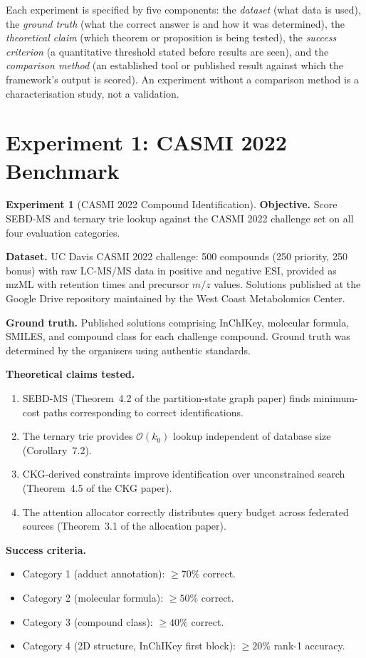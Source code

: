 \documentclass[11pt,a4paper]{article}
\theoremstyle{planstyle}
\theoremstyle{definition}
\newtheorem{experiment}[theorem]{Experiment}
\theoremstyle{remark}
\begin{document}
Each experiment is specified by five components: the \emph{dataset}
(what data is used), the \emph{ground truth} (what the correct answer
is and how it was determined), the \emph{theoretical claim} (which
theorem or proposition is being tested), the \emph{success criterion}
(a quantitative threshold stated before results are seen), and the
\emph{comparison method} (an established tool or published result
against which the framework's output is scored). An experiment without
a comparison method is a characterisation study, not a validation.

\section{Experiment 1: CASMI 2022 Benchmark}
\label{sec:exp-casmi}

\begin{experiment}[CASMI 2022 Compound Identification]
\label{exp:casmi}
\textbf{Objective.} Score SEBD-MS and ternary trie lookup against the
CASMI 2022 challenge set on all four evaluation categories.

\textbf{Dataset.} UC Davis CASMI 2022 challenge: 500 compounds (250
priority, 250 bonus) with raw LC-MS/MS data in positive and negative ESI,
provided as mzML with retention times and precursor $m/z$ values. Solutions
published at the Google Drive repository maintained by the West Coast
Metabolomics Center.

\textbf{Ground truth.} Published solutions comprising InChIKey, molecular
formula, SMILES, and compound class for each challenge compound. Ground
truth was determined by the organisers using authentic standards.

\textbf{Theoretical claims tested.}
\begin{enumerate}[nosep,label=(\roman*)]
\item SEBD-MS (Theorem~4.2 of the partition-state graph paper) finds
  minimum-cost paths corresponding to correct identifications.
\item The ternary trie provides $\mathcal{O}(k_0)$ lookup independent
  of database size (Corollary~7.2).
\item CKG-derived constraints improve identification over unconstrained
  search (Theorem~4.5 of the CKG paper).
\item The attention allocator correctly distributes query budget across
  federated sources (Theorem~3.1 of the allocation paper).
\end{enumerate}

\textbf{Success criteria.}
\begin{itemize}[nosep]
\item Category 1 (adduct annotation): $\geq 70\%$ correct.
\item Category 2 (molecular formula): $\geq 50\%$ correct.
\item Category 3 (compound class): $\geq 40\%$ correct.
\item Category 4 (2D structure, InChIKey first block): $\geq 20\%$
  rank-1 accuracy.
\end{itemize}


\end{experiment}
\end{document}
